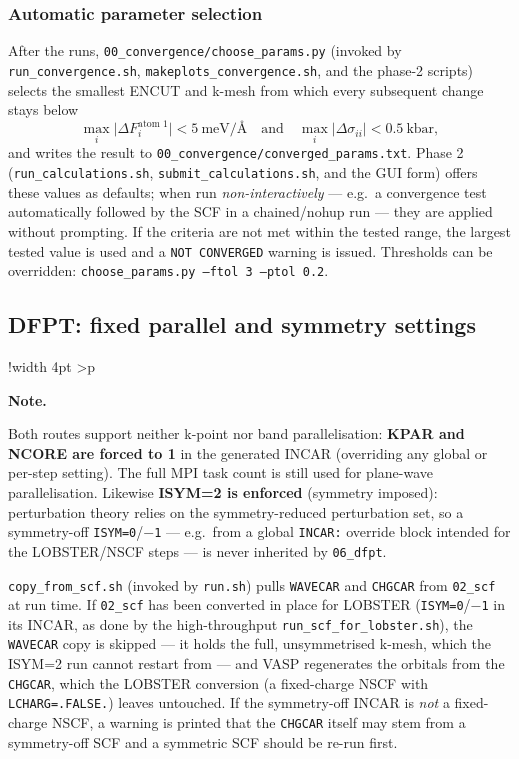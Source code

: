 \documentclass[11pt,a4paper]{scrartcl}
\newlength{\boxwidth}
\newenvironment{notebox}{%
  \par\vspace{6pt}%
  \setlength{\tabcolsep}{5pt}%
  \setlength{\boxwidth}{\dimexpr\linewidth - 4pt - 2\tabcolsep}%
  \noindent\begin{tabular}{!{\color{notebar}\vrule width 4pt}%
      >{\columncolor{notebg}}p{\boxwidth}}%
  \rule{0pt}{11pt}\textbf{\textcolor{notebar}{Note.}}\enspace\ignorespaces%
}{%
  \rule[-4pt]{0pt}{4pt}%
  \end{tabular}\par\vspace{6pt}%
}
\begin{document}
\subsubsection{Automatic parameter selection}

After the runs, \texttt{00\_convergence/choose\_params.py} (invoked by
\texttt{run\_convergence.sh}, \texttt{makeplots\_convergence.sh}, and the
phase-2 scripts) selects the smallest ENCUT and k-mesh from which every
subsequent change stays below
\[
  \max_i \bigl|\Delta F_i^{\text{atom 1}}\bigr| < 5~\text{meV/\AA}
  \quad\text{and}\quad
  \max_i \bigl|\Delta \sigma_{ii}\bigr| < 0.5~\text{kbar},
\]
and writes the result to \texttt{00\_convergence/converged\_params.txt}.
Phase 2 (\texttt{run\_calculations.sh}, \texttt{submit\_calculations.sh},
and the GUI form) offers these values as defaults; when run
\emph{non-interactively} --- e.g.\ a convergence test automatically
followed by the SCF in a chained/nohup run --- they are applied without
prompting.  If the criteria are not met within the tested range, the
largest tested value is used and a \texttt{NOT CONVERGED} warning is
issued.  Thresholds can be overridden:
\texttt{choose\_params.py --ftol 3 --ptol 0.2}.

\subsection{DFPT: fixed parallel and symmetry settings}
\label{app:dfpt}

\begin{notebox}
Both routes support neither k-point nor band parallelisation:
\textbf{KPAR and NCORE are forced to 1} in the generated INCAR
(overriding any global or per-step setting).  The full MPI task count
is still used for plane-wave parallelisation.
Likewise \textbf{ISYM=2 is enforced} (symmetry imposed): perturbation
theory relies on the symmetry-reduced perturbation set, so a
symmetry-off \texttt{ISYM=0}/\texttt{$-$1} --- e.g.\ from a global
\texttt{INCAR:} override block intended for the LOBSTER/NSCF steps ---
is never inherited by \texttt{06\_dfpt}.
\end{notebox}

\texttt{copy\_from\_scf.sh} (invoked by \texttt{run.sh}) pulls
\texttt{WAVECAR} and \texttt{CHGCAR} from \texttt{02\_scf} at run time.
If \texttt{02\_scf} has been converted in place for LOBSTER
(\texttt{ISYM=0}/\texttt{$-$1} in its INCAR, as done by the
high-throughput \texttt{run\_scf\_for\_lobster.sh}), the
\texttt{WAVECAR} copy is skipped --- it holds the full, unsymmetrised
k-mesh, which the ISYM=2 run cannot restart from --- and VASP
regenerates the orbitals from the \texttt{CHGCAR}, which the LOBSTER
conversion (a fixed-charge NSCF with \texttt{LCHARG=.FALSE.}) leaves
untouched.  If the symmetry-off INCAR is \emph{not} a fixed-charge
NSCF, a warning is printed that the \texttt{CHGCAR} itself may stem
from a symmetry-off SCF and a symmetric SCF should be re-run first.
\end{document}
